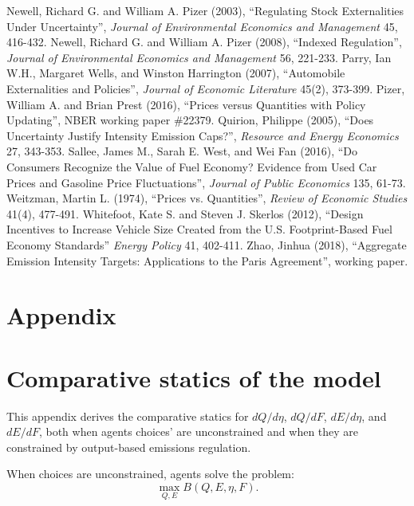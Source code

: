 \documentclass[12pt]{article}
\begin{document}
\begin{thebibliography}{99}
\bibitem{} Newell, Richard G. and William A. Pizer (2003), ``Regulating Stock Externalities Under Uncertainty'', {\it Journal of Environmental Economics and Management} 45, 416-432.
\bibitem{} Newell, Richard G. and William A. Pizer (2008), ``Indexed Regulation'', {\it Journal of Environmental Economics and Management} 56, 221-233.
\bibitem{} Parry, Ian W.H., Margaret Wells, and Winston Harrington (2007), ``Automobile Externalities and Policies'', {\it Journal of Economic Literature} 45(2), 373-399.
\bibitem{} Pizer, William A. and Brian Prest (2016), ``Prices versus Quantities with Policy Updating'', NBER working paper \#22379.
\bibitem{} Quirion, Philippe (2005), ``Does Uncertainty Justify Intensity Emission Caps?'', {\it Resource and Energy Economics} 27, 343-353.
\bibitem{} Sallee, James M., Sarah E. West, and Wei Fan (2016), ``Do Consumers Recognize the Value of Fuel Economy? Evidence from Used Car Prices and Gasoline Price Fluctuations'', {\it Journal of Public Economics} 135, 61-73.
\bibitem{} Weitzman, Martin L. (1974), ``Prices vs. Quantities'', {\it Review of Economic Studies} 41(4), 477-491.
\bibitem{} Whitefoot, Kate S. and Steven J. Skerlos (2012), ``Design Incentives to Increase Vehicle Size Created from the U.S. Footprint-Based Fuel Economy Standards'' {\it Energy Policy} 41, 402-411.
\bibitem{} Zhao, Jinhua (2018), ``Aggregate Emission Intensity Targets: Applications to the Paris Agreement'', working paper.

\end{thebibliography}

\singlespace
\newpage


\appendix
\setcounter{page}{1}
\renewcommand{\thepage}{A-\arabic{page}}

\section*{Appendix}


\section{Comparative statics of the model} \label{appx:cs}

This appendix derives the comparative statics for $dQ/d\eta$, $dQ/dF$, $dE/d\eta$, and $dE/dF$, both when agents choices' are unconstrained and when they are constrained by output-based emissions regulation.

When choices are unconstrained, agents solve the problem:
\begin{equation}
\max_{Q,E} B(Q,E,\eta,F).
\end{equation}
\end{document}
